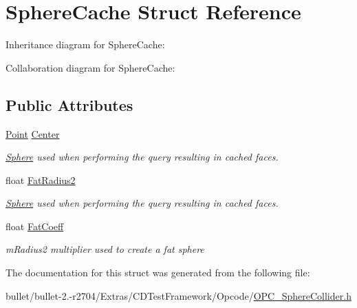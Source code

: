 \hypertarget{struct_sphere_cache}{\section{Sphere\+Cache Struct Reference}
\label{struct_sphere_cache}
}


Inheritance diagram for Sphere\+Cache\+:


Collaboration diagram for Sphere\+Cache\+:
\subsection*{Public Attributes}
\begin{DoxyCompactItemize}
\item 
\hypertarget{struct_sphere_cache_aa6ec7c5daea430bac4f5647011ae4707}{\hyperlink{class_point}{Point} \hyperlink{struct_sphere_cache_aa6ec7c5daea430bac4f5647011ae4707}{Center}}\label{struct_sphere_cache_aa6ec7c5daea430bac4f5647011ae4707}

\begin{DoxyCompactList}\small\item\em \hyperlink{class_sphere}{Sphere} used when performing the query resulting in cached faces. \end{DoxyCompactList}\item 
\hypertarget{struct_sphere_cache_a1515c1ca0af84c14fa98c8fac7af8eec}{float \hyperlink{struct_sphere_cache_a1515c1ca0af84c14fa98c8fac7af8eec}{Fat\+Radius2}}\label{struct_sphere_cache_a1515c1ca0af84c14fa98c8fac7af8eec}

\begin{DoxyCompactList}\small\item\em \hyperlink{class_sphere}{Sphere} used when performing the query resulting in cached faces. \end{DoxyCompactList}\item 
\hypertarget{struct_sphere_cache_ae4a6ac5ac1ffbfeadacd74e548832f7e}{float \hyperlink{struct_sphere_cache_ae4a6ac5ac1ffbfeadacd74e548832f7e}{Fat\+Coeff}}\label{struct_sphere_cache_ae4a6ac5ac1ffbfeadacd74e548832f7e}

\begin{DoxyCompactList}\small\item\em m\+Radius2 multiplier used to create a fat sphere \end{DoxyCompactList}\end{DoxyCompactItemize}


The documentation for this struct was generated from the following file\+:\begin{DoxyCompactItemize}
\item 
bullet/bullet-\/2.-\/r2704/\+Extras/\+C\+D\+Test\+Framework/\+Opcode/\hyperlink{_o_p_c___sphere_collider_8h}{O\+P\+C\+\_\+\+Sphere\+Collider.\+h}\end{DoxyCompactItemize}
